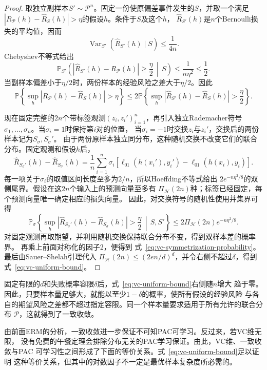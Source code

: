 \begin{proof}
取独立副样本$S'\sim\mathcal P^n$。固定一份使原偏差事件发生的$S$，并取一个满足
$|R_{\mathcal P}(h)-\hat R_S(h)|>\eta$的假设$h$。条件于$S$及这个$h$，
$\hat R_{S'}(h)$是$n$个Bernoulli损失的平均值，因而
\[
 \operatorname{Var}_{S'}\!\left(\hat R_{S'}(h)\mid S\right)
 \leq\frac{1}{4n}.
\]
Chebyshev不等式给出
\[
 \mathbb P_{S'}\left(
   |\hat R_{S'}(h)-R_{\mathcal P}(h)|\geq\frac{\eta}{2}
   \,\middle|\,S
 \right)
 \leq\frac{1}{n\eta^2}\leq\frac12.
\]
当副样本偏差小于$\eta/2$时，两份样本的经验风险之差大于$\eta/2$。因此
\[
 \mathbb P\left\{\sup_h|R_{\mathcal P}(h)-\hat R_S(h)|>\eta\right\}
 \leq
 2\mathbb P\left\{\sup_h|\hat R_{S'}(h)-\hat R_S(h)|>\frac\eta2\right\}.
\]

现在固定完整的$2n$个带标签观测$(z_i,z_i')_{i=1}^n$，再引入独立Rademacher符号
$\sigma_1,\ldots,\sigma_n$。当$\sigma_i=1$时保持第$i$对的位置，
当$\sigma_i=-1$时交换$z_i$与$z_i'$，交换后的两份样本记为$S_\sigma,S_\sigma'$。
由于两份原样本独立同分布，这种随机交换不改变它们的联合分布。固定观测和假设$h$后，
\[
 \hat R_{S_\sigma'}(h)-\hat R_{S_\sigma}(h)
 =\frac1n\sum_{i=1}^n\sigma_i
 \left[\ell_{01}(h(x_i'),y_i')-\ell_{01}(h(x_i),y_i)\right].
\]
每一项关于$\sigma_i$的取值区间长度至多为$2/n$，所以Hoeffding不等式给出
$2e^{-n\eta^2/8}$的双侧尾界。假设在这$2n$个输入上的预测向量至多有
$\Pi_{\mathcal H}(2n)$种；标签已经固定，每个预测向量唯一确定相应的损失向量。
因此，对交换符号的随机性使用并集界可得
\[
 \mathbb P_\sigma\left\{
   \sup_h|\hat R_{S_\sigma'}(h)-\hat R_{S_\sigma}(h)|>\frac\eta2
   \,\middle|\,S,S'
 \right\}
 \leq2\Pi_{\mathcal H}(2n)e^{-n\eta^2/8}.
\]
对固定观测再取期望，并利用随机交换保持联合分布不变，得到双样本差的概率界。
再乘上前面对称化的因子2，便得到
式~\eqref{eq:vc-symmetrization-probability}。最后由Sauer--Shelah引理代入
$\Pi_{\mathcal H}(2n)\leq(2en/d)^d$，并令右侧不超过$\delta$，得到
式~\eqref{eq:vc-uniform-bound}。
\end{proof}

固定有限的$d$和失败概率容限$\delta$后，式~\eqref{eq:vc-uniform-bound}右侧随$n$增大
趋于零。因此，只要样本量足够大，就能以至少$1-\delta$的概率，使所有假设的经验风险
与各自的期望风险之差都不超过指定容限。同一个样本量要求适用于所有允许的联合分布
$\mathcal P$，这就得到了一致收敛。

由前面ERM的分析，一致收敛进一步保证不可知PAC可学习。反过来，若VC维无限，
没有免费的午餐定理会排除分布无关的PAC学习保证。由此，VC维、一致收敛与PAC
可学习性之间形成了下面的等价关系。式~\eqref{eq:vc-uniform-bound}足以证明
这种等价关系，但其中的对数因子不一定是最优样本复杂度所必需的。


